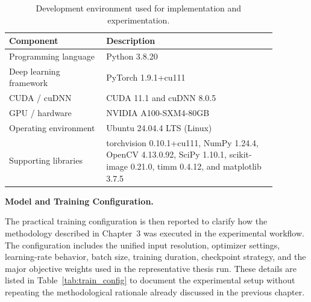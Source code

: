 \documentclass[12pt, twoside]{report}
\begin{document}
\begin{table}[H]
\centering
\caption{Development environment used for implementation and experimentation.}
\label{tab:dev_environment}
\begin{tabular}{>{\raggedright\arraybackslash}p{0.32\linewidth} >{\raggedright\arraybackslash}p{0.56\linewidth}}
\toprule
\textbf{Component} & \textbf{Description} \\
\midrule
Programming language & Python 3.8.20 \\
Deep learning framework & PyTorch 1.9.1+cu111 \\
CUDA / cuDNN & CUDA 11.1 and cuDNN 8.0.5 \\
GPU / hardware & NVIDIA A100-SXM4-80GB \\
Operating environment & Ubuntu 24.04.4 LTS (Linux) \\
Supporting libraries & torchvision 0.10.1+cu111, NumPy 1.24.4, OpenCV 4.13.0.92, SciPy 1.10.1, scikit-image 0.21.0, timm 0.4.12, and matplotlib 3.7.5 \\
\bottomrule
\end{tabular}
\end{table}

\vspace{0.35\baselineskip}
\noindent\textbf{Model and Training Configuration.}\par

The practical training configuration is then reported to clarify how the methodology described in Chapter~3 was executed in the experimental workflow. The configuration includes the unified input resolution, optimizer settings, learning-rate behavior, batch size, training duration, checkpoint strategy, and the major objective weights used in the representative thesis run. These details are listed in Table~\ref{tab:train_config} to document the experimental setup without repeating the methodological rationale already discussed in the previous chapter.
\end{document}
